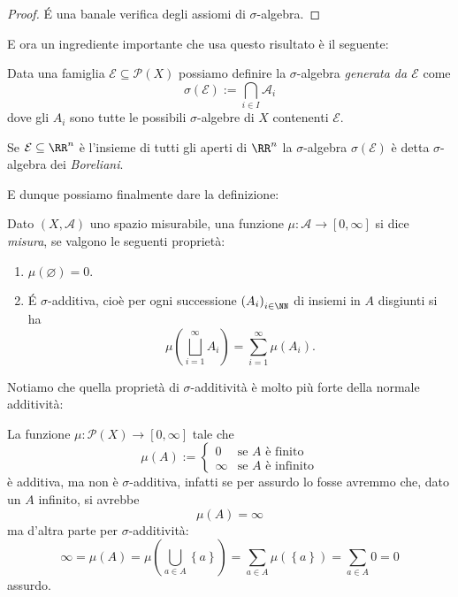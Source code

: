 \documentclass[11pt]{scrartcl}
\newcommand{\eset}{\varnothing}
\newcommand{\parti}[1]{\mathcal{P}\!\left(#1\right)}
\begin{document}
	\begin{proof}
		\'E una banale verifica degli assiomi di $\sigma$-algebra.
	\end{proof}
	E ora un ingrediente importante che usa questo risultato è il seguente:
	\begin{definition}
		Data una famiglia $\mathcal{E}\subseteq\parti{X}$ possiamo definire la $\sigma$-algebra \textit{generata da $\mathcal{E}$} come
		$$\sigma\left(\mathcal{E}\right):=\bigcap_{i\in I}\mathcal{A}_i$$
		dove gli $A_i$ sono tutte le possibili $\sigma$-algebre di $X$ contenenti $\mathcal{E}$.
	\end{definition}
	\begin{example}[Boreliani]
		Se $\mathcal{E}\subseteq\RR^n$ è l'insieme di tutti gli aperti di $\RR^n$ la $\sigma$-algebra $\sigma(\mathcal{E})$ è detta $\sigma$-algebra dei \textit{Boreliani}. 
	\end{example}
	E dunque possiamo finalmente dare la definizione:
	\begin{definition}[Misura]
		Dato $(X,\mathcal{A})$ uno spazio misurabile, una funzione $\mu:\mathcal{A}\to [0,\infty]$ si dice \textit{misura}, se valgono le seguenti proprietà:
		\begin{enumerate}
			\item $\mu(\eset)=0$.
			\item \'E $\sigma$-additiva, cioè per ogni successione $\left(A_i\right)_{i\in\NN}$ di insiemi in $A$ disgiunti si ha
			$$\mu\left(\bigsqcup_{i=1}^\infty A_i\right)=\sum_{i=1}^{\infty}\mu\left(A_i\right).$$
		\end{enumerate}
	\end{definition}
	Notiamo che quella proprietà di $\sigma$-additività è molto più forte della normale additività:
	\begin{example}
		La funzione $\mu:\parti{X}\to [0,\infty]$ tale che 
		$$\mu(A):=\begin{cases}
			0 & \text{se $A$ è finito} \\
			\infty & \text{se $A$ è infinito}
		\end{cases}$$
		è additiva, ma non è $\sigma$-additiva, infatti se per assurdo lo fosse avremmo che, dato un $A$ infinito, si avrebbe
		$$\mu(A)=\infty$$
		ma d'altra parte per $\sigma$-additività:
		$$\infty=\mu\left(A\right)=\mu\left(\bigcup_{a\in A}\left\{a\right\}\right)=\sum_{a\in A} \mu\left(\left\{a\right\}\right)=\sum_{a\in A}0=0$$
		assurdo.
	\end{example}
\end{document}
